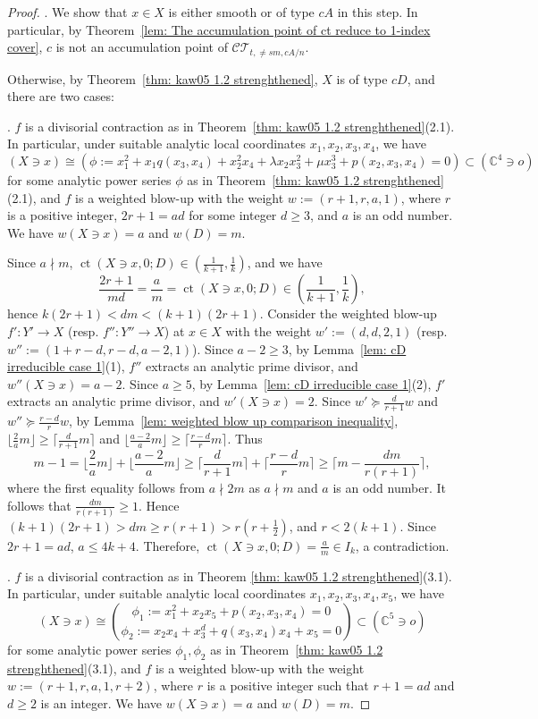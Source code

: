 \documentclass[11pt]{amsart}
\numberwithin{equation}{section}
\newcommand{\ct}{\operatorname{ct}}
\theoremstyle{definition}
\theoremstyle{definition}
\begin{document}
\begin{proof}
. We show that $x\in X$ is either smooth or of type $cA$ in this step. In particular, by Theorem~\ref{lem: The accumulation point of ct reduce to 1-index cover}, $c$ is not an accumulation point of $\mathcal{CT}_{t,\neq sm,cA/n}$.

Otherwise, by Theorem~\ref{thm: kaw05 1.2 strenghthened}, $X$ is of type $cD$, and there are two cases:

\medskip

. $f$ is a divisorial contraction as in Theorem~\ref{thm: kaw05 1.2 strenghthened}(2.1). In particular, under suitable analytic local coordinates $x_1,x_2,x_3,x_4$, we have $$(X\ni x)\cong (\phi:= x_1^2+x_1q(x_3,x_4)+x_2^2x_4+\lambda x_2x_3^2+\mu x_3^3+p(x_2,x_3,x_4)=0)\subset (\mathbb C^4\ni o)$$ for some analytic power series $\phi$ as in Theorem~\ref{thm: kaw05 1.2 strenghthened}(2.1), and $f$ is a weighted blow-up with the weight $w:=(r+1,r,a,1)$, where $r$ is a positive integer, $2r+1=ad$ for some integer $d\geq 3$, and $a$ is an odd number. We have $w(X\ni x)=a$ and $w(D)=m$.

Since $a\nmid m$, $\ct(X\ni x,0;D)\in (\frac{1}{k+1},\frac{1}{k})$, and we have $$\frac{2r+1}{md}=\frac{a}{m}=\ct(X\ni x,0; D)\in (\frac{1}{k+1},\frac{1}{k}),$$ hence $k(2r+1)<dm<(k+1)(2r+1)$. Consider the weighted blow-up $f': Y'\to X$ (resp. $f'': Y''\to X$) at $x\in X$ with the weight $w':=(d,d,2,1)$ (resp. $w'':=(1+r-d,r-d,a-2,1)$). Since $a-2\geq 3$, by Lemma~\ref{lem: cD irreducible case 1}(1), $f''$ extracts an analytic prime divisor, and $w''(X\ni x)=a-2$. Since $a\geq 5$, by Lemma~\ref{lem: cD irreducible case 1}(2), $f'$ extracts an analytic prime divisor, and $w'(X\ni x)=2$. Since $w'\succeq \frac{d}{r+1}w$ and $w''\succeq \frac{r-d}{r}w$, by Lemma~\ref{lem: weighted blow up comparison inequality}, $\lfloor\frac{2}{a}m\rfloor\geq\lceil\frac{d}{r+1}m\rceil$ and $\lfloor\frac{a-2}{a}m\rfloor\geq\lceil\frac{r-d}{r}m\rceil$. Thus $$m-1=\lfloor\frac{2}{a}m\rfloor+\lfloor\frac{a-2}{a}m\rfloor\geq \lceil\frac{d}{r+1}m\rceil+\lceil\frac{r-d}{r}m\rceil\geq \lceil m-\frac{dm}{r(r+1)}\rceil,$$ where the first equality follows from $a\nmid 2m$ as $a\nmid m$ and $a$ is an odd number. It follows that $\frac{dm}{r(r+1)}\geq 1$. Hence $(k+1)(2r+1)>dm\geq r(r+1)>r(r+\frac{1}{2})$, and $r<2(k+1)$. Since $2r+1=ad$, $a\leq 4k+4$. Therefore, $\ct(X\ni x,0; D)=\frac{a}{m}\in I_k$, a contradiction.

\medskip
        
. $f$ is a divisorial contraction as in Theorem \ref{thm: kaw05 1.2 strenghthened}(3.1). In particular, under suitable analytic local coordinates $x_1,x_2,x_3,x_4,x_5$, we have $$(X\ni x)\cong \binom{\phi_1:= x_1^2+x_2x_5+p(x_2,x_3,x_4)=0}{\phi_2:= x_2x_4+x_3^d+q(x_3,x_4)x_4+x_5=0}\subset(\mathbb C^5\ni o)$$ for some analytic power series $\phi_1,\phi_2$ as in Theorem~\ref{thm: kaw05 1.2 strenghthened}(3.1), and $f$ is a weighted blow-up with the weight $w:=(r+1,r,a,1,r+2)$, where $r$ is a positive integer such that $r+1=ad$ and $d\geq 2$ is an integer. We have $w(X\ni x)=a$ and $w(D)=m$.
        

\end{proof}
\end{document}

